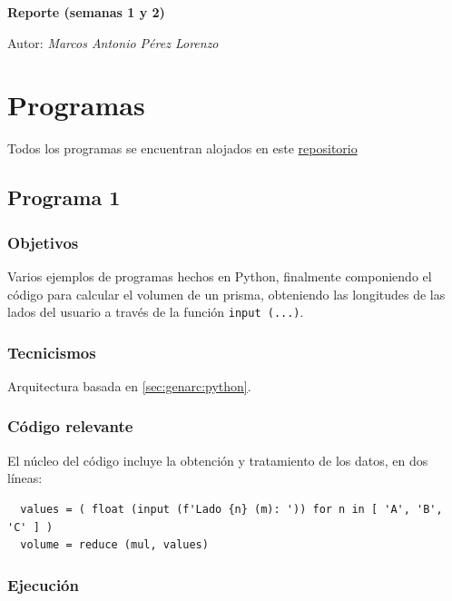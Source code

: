 \documentclass{article}[12pt,a4paper]
\begin{document}
\begin{titlepage}

  \centering
  {\huge\bfseries Reporte (semanas 1 y 2)\par}
	{\Large Autor: \itshape Marcos Antonio Pérez Lorenzo\par}
\end{titlepage}

\pagebreak



\section{Programas}

Todos los programas se encuentran alojados en este \href{https://github.com/MarcosHCK/master-programming/}{repositorio \faGithubSquare}

\subsection{Programa 1}

\subsubsection{Objetivos}

Varios ejemplos de programas hechos en Python, finalmente componiendo el código para calcular el volumen de un prisma, obteniendo las longitudes de las lados del usuario a través de la función \texttt{input (...)}.

\subsubsection{Tecnicismos}

Arquitectura basada en \ref{sec:genarc:python}.

\subsubsection{Código relevante}

El núcleo del código incluye la obtención y tratamiento de los datos, en dos líneas:

\begin{verbatim}
  values = ( float (input (f'Lado {n} (m): ')) for n in [ 'A', 'B', 'C' ] )
  volume = reduce (mul, values)
\end{verbatim}

\subsubsection{Ejecución}
\end{document}
